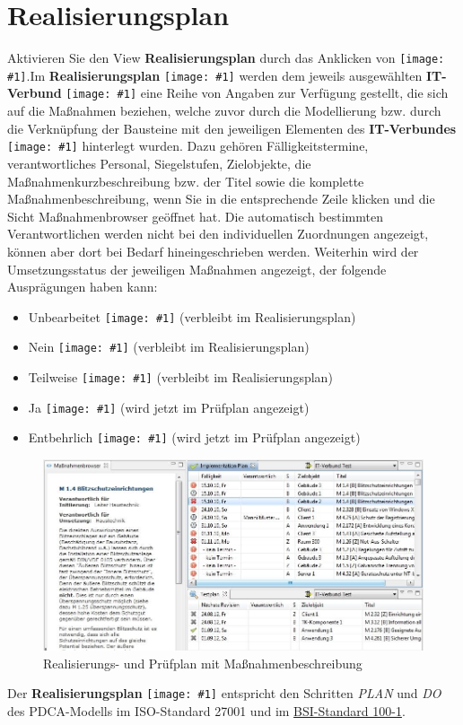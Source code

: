 \documentclass[a4paper,10pt]{book}
\newcommand{\icon}[1]{\texttt{[image: \#1]}}
\begin{document}
\section{Realisierungsplan}
Aktivieren Sie den View \textbf{Realisierungsplan} durch das Anklicken von \icon{Icon/Okay.png}.Im \textbf{Realisierungsplan} \icon{Icon/Okay.png} werden dem jeweils ausgewählten \textbf{IT-Verbund} \icon{Icon/GS_Modell.png} eine Reihe von Angaben zur Verfügung gestellt, die sich auf die Maßnahmen beziehen, welche zuvor durch die Modellierung bzw. durch die Verknüpfung der Bausteine mit den jeweiligen Elementen des \textbf{IT-Verbundes} \icon{Icon/GS_Modell.png} hinterlegt wurden. Dazu gehören Fälligkeitstermine, verantwortliches Personal, Siegelstufen, Zielobjekte, die Maßnahmenkurzbeschreibung bzw. der Titel sowie die komplette Maßnahmenbeschreibung, wenn Sie in die entsprechende Zeile klicken und die Sicht Maßnahmenbrowser geöffnet hat. Die automatisch bestimmten Verantwortlichen werden nicht bei den individuellen Zuordnungen angezeigt, können aber dort bei Bedarf hineingeschrieben werden. Weiterhin wird der
Umsetzungsstatus der jeweiligen Maßnahmen angezeigt, der folgende Ausprägungen haben kann:
\begin{itemize}
 \item Unbearbeitet \icon{Icon/Unbearbeitet.png} (verbleibt im Realisierungsplan)
 \item Nein \icon{Icon/Nein.png} (verbleibt im Realisierungsplan)
 \item Teilweise \icon{Icon/Teilweise.png} (verbleibt im Realisierungsplan)
 \item Ja \icon{Icon/Okay.png} (wird jetzt im Prüfplan angezeigt)
 \item Entbehrlich \icon{Icon/Entbehrlich.png} (wird jetzt im Prüfplan angezeigt)
\end{itemize}
\begin{figure}[htb!]
  \centering
  \includegraphics[scale=.36]{Screenshot/Realisierungsplan.jpg}
  \caption{\label{Realisierungs- und Pruefplan mit Massnahmenbeschreibung} Realisierungs- und Prüfplan mit Maßnahmenbeschreibung}
\end{figure}
Der \textbf{Realisierungsplan} \icon{Icon/Okay.png} entspricht den Schritten \textit{PLAN} und \textit{DO} des PDCA-Modells im ISO-Standard 27001 und im \href{https://www.bsi.bund.de/DE/Themen/ITGrundschutz/ITGrundschutzStandards/ITGrundschutzStandards_node.html#doc471418bodyText1}{BSI-Standard 100-1}.
\end{document}
